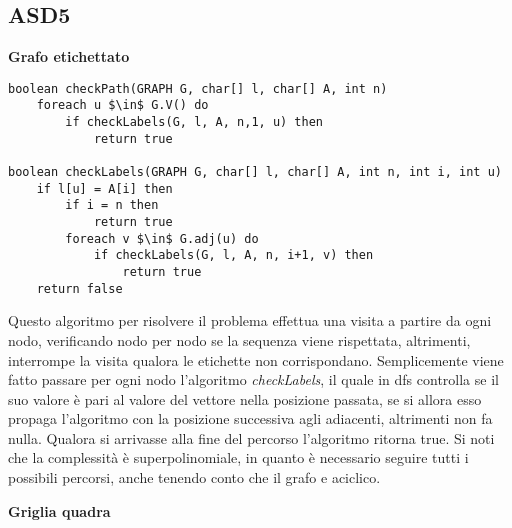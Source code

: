 \documentclass[../cheatSheetAlgoritmi.tex]{subfiles}
\begin{document}
\subsection{ASD5}
\textbf{Grafo etichettato}
\begin{lstlisting}[caption=Il grafo contiene la sottosequenza LODE?]
boolean checkPath(GRAPH G, char[] l, char[] A, int n)
	foreach u $\in$ G.V() do
    	if checkLabels(G, l, A, n,1, u) then
      		return true

boolean checkLabels(GRAPH G, char[] l, char[] A, int n, int i, int u)
	if l[u] = A[i] then
    	if i = n then
      		return true
    	foreach v $\in$ G.adj(u) do
      		if checkLabels(G, l, A, n, i+1, v) then
        		return true
  	return false
\end{lstlisting}
Questo algoritmo per risolvere il problema effettua una visita a
partire da ogni nodo, verificando nodo per nodo se la sequenza viene rispettata, altrimenti, interrompe la
visita qualora le etichette non corrispondano. Semplicemente viene fatto passare per ogni nodo l'algoritmo \textit{checkLabels}, il quale in dfs controlla se il suo valore è pari al valore del vettore nella posizione passata, se si allora esso propaga l'algoritmo con la posizione successiva agli adiacenti, altrimenti non fa nulla. Qualora si arrivasse alla fine del percorso l'algoritmo ritorna true. Si noti che la complessità è superpolinomiale, in quanto è
necessario seguire tutti i possibili percorsi, anche tenendo conto che il
grafo e aciclico.

\textbf{Griglia quadra}
\end{document}
